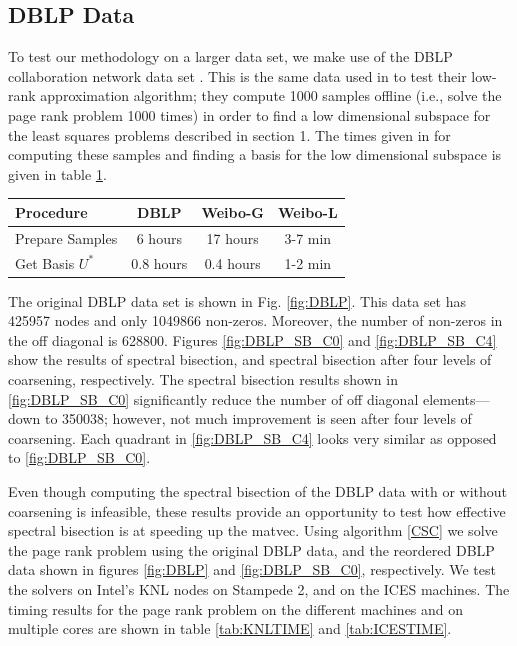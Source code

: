 \documentclass[11pt]{article}
\begin{document}
\subsection{DBLP Data}
To test our methodology on a larger data set, we make use of the DBLP
collaboration network data set \cite{snapnets,dblp}. This is the same data used
in \cite{xie} to test their low-rank approximation algorithm; they compute 1000
samples offline (i.e., solve the page rank problem 1000 times) in order to find a
low dimensional subspace for the least squares problems described in section 1.
The times given in \cite{xie} for
computing these samples and finding a basis for the low dimensional subspace 
is given in table \ref{tab:time}.

\begin{table}[h]
	\centering 
{}
   \begin{tabular}[h]{|l|c|c|c|}
	   \hline 
	   \textbf{Procedure} & \textbf{DBLP} & \textbf{Weibo-G} &
	   \textbf{Weibo-L} \\
	   \hline
	   Prepare Samples & 6 hours & 17 hours & 3-7 min \\ 
	   Get Basis $U^*$ & 0.8 hours & 0.4 hours & 1-2 min \\
	   \hline
   \end{tabular}
\label{tab:time}
\end{table}

The original DBLP data set is shown in Fig. \ref{fig:DBLP}. This data set
has 425957 nodes and only 1049866 non-zeros. Moreover, the number of non-zeros
in the off diagonal is 628800. Figures \ref{fig:DBLP_SB_C0} and
\ref{fig:DBLP_SB_C4} show the results of spectral bisection, and spectral
bisection after four levels of coarsening, respectively. The spectral bisection
results shown in \ref{fig:DBLP_SB_C0} significantly reduce the number of off
diagonal elements---down to 350038; however, not much improvement is seen after
four levels of coarsening. Each quadrant in \ref{fig:DBLP_SB_C4} looks very
similar as opposed to \ref{fig:DBLP_SB_C0}.

Even though computing the spectral bisection of the DBLP data with or without
coarsening is infeasible, these results provide an opportunity to test how
effective spectral bisection is at speeding up the matvec. Using algorithm
\ref{CSC} we solve the page rank problem using the original DBLP data, and the
reordered DBLP data shown in figures \ref{fig:DBLP} and \ref{fig:DBLP_SB_C0},
respectively. We test the solvers on Intel's KNL nodes on Stampede 2, and on the
ICES machines. The timing results for the page rank problem on the different
machines and on multiple cores are shown in table \ref{tab:KNLTIME} and
\ref{tab:ICESTIME}.
\end{document}
